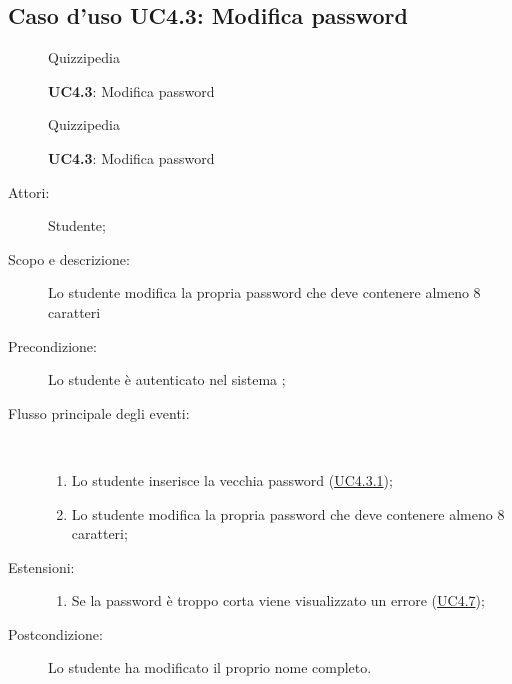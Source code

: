 \subsection{Caso d'uso UC4.3: Modifica password}
	\begin{figure}[H]
		\centering
		\begin{resizedtikzpicture}{\textwidth}
		\begin{umlsystem}[x=0, fill=lightgray!20]{Quizzipedia}
		\end{umlsystem}
		\end{resizedtikzpicture}
		\caption{\textbf{UC4.3}: Modifica password}
		\label{UC4.3}
	\end{figure}

	\begin{figure}[H]
		\centering
		\begin{resizedtikzpicture}{\textwidth}
		\begin{umlsystem}[x=0, fill=lightgray!20]{Quizzipedia}
		\end{umlsystem}
		\end{resizedtikzpicture}
		\caption{\textbf{UC4.3}: Modifica password}
		\label{UC4.3}
	\end{figure}
\begin{description}
\item[Attori:] Studente;
\item[Scopo e descrizione:] Lo studente modifica la propria password che deve contenere almeno 8 caratteri
      \item[Precondizione:] Lo studente è autenticato nel sistema
;

        \item[Flusso principale degli eventi:] \ 
 \begin{enumerate}
          \item Lo studente inserisce la vecchia password (\hyperlink{UC4.3.1}{UC4.3.1});
          \item Lo studente modifica la propria password che deve contenere almeno 8 caratteri;

      \end{enumerate}
    \item[Estensioni:]
      \begin{enumerate}
          \item Se la password è troppo corta viene visualizzato un errore	 (\hyperlink{UC4.7}{UC4.7});

      \end{enumerate}
    \item[Postcondizione:] Lo studente ha modificato il proprio nome completo.
  \end{description}
\hypertarget{UC4.3.1}{}
